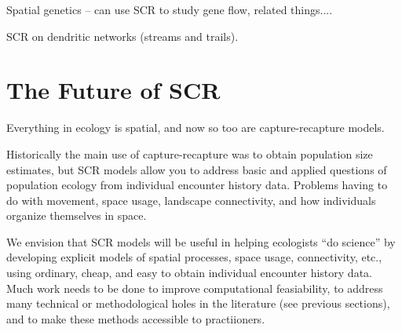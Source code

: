 Spatial genetics  -- can use SCR to study gene flow, related things....

SCR on dendritic networks (streams and trails).





\section{The Future of SCR}

Everything in ecology is spatial, and now so too are capture-recapture
models.

Historically the main use of capture-recapture was to obtain population
size estimates, but
SCR models allow you to address basic and applied questions of
population ecology from individual encounter history data. Problems
having to do with movement, space usage, landscape connectivity, and
how individuals organize themselves in space. 

We envision that SCR models will be useful in helping
ecologists ``do science'' by developing explicit models of spatial
processes, space usage, connectivity, etc., using ordinary, cheap, and
easy to obtain individual encounter history data. Much work needs to
be done to improve computational feasiability, to address many
technical or methodological holes in the literature (see previous
sections), and to make these methods accessible to practiioners.












